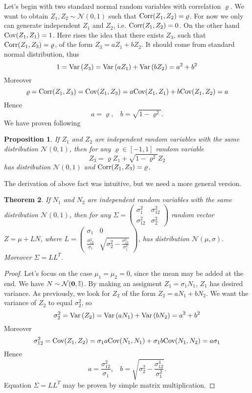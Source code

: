 \documentclass[a4paper,12pt, oneside]{book}
\newtheorem{thm}{Theorem}[section]
\newtheorem{prop}[thm]{Proposition}
\theoremstyle{definition}
\theoremstyle{remark}
\def\Var{{\rm Var}\,}
\def\Cov{{\hbox{Cov}}}
\def\Corr{{\hbox{Corr}}}
\begin{document}
Let's begin with two standard normal random variables with correlation $\varrho$. We want to obtain $Z_1, Z_2 \sim \mathcal{N}(0,1)$ such that $\Corr(Z_1, Z_2) = \varrho$.  For now we only can generate independent $Z_1$ and $Z_2$, i.e. $\Corr(Z_1, Z_2) = 0$. On the other hand $\Cov(Z_1, Z_1) = 1$. Here rises the idea that there exists $Z_3$, such that $\Corr(Z_1, Z_3) = \varrho$, of the form $Z_3 = a Z_1 + b Z_2$. It should come from standard normal distribution, thus
\[ 1 = \Var(Z_3) = \Var( a Z_1) +  \Var(b Z_2) = a^2 + b^2 \]
Moreover
\[ \varrho = \Corr(Z_1, Z_3) = \Cov(Z_1, Z_3) = a\Cov(Z_1, Z_1) + b\Cov(Z_1, Z_2) = a \]
Hence
\[ a = \varrho,\ \ \ \ b = \sqrt{1 - \varrho^2}. \]
We have proven following
\begin{prop}
 If $Z_1$ and $Z_2$ are independent random variables with the same distribution $\mathcal{N}(0,1)$, then for any $\varrho \in [-1,1]$ random variable
 \[ Z_3 = \varrho Z_1 + \sqrt{1 - \varrho^2} Z_2 \]
 has distribution $\mathcal{N}(0,1)$ and $\Corr(Z_1, Z_3) = \varrho$.
\end{prop}
The derivation of above fact was intuitive, but we need a more general version.


\begin{thm}
 If $N_1$ and $N_2$ are independent random variables with the same distribution $\mathcal{N}(0,1)$, then for any
 $\Sigma = \left( \begin{array}{cc}
                      \sigma_1^2 & \sigma_{12}^2 \\
                      \sigma_{12}^2 & \sigma_2^2
                   \end{array} \right)$
 random vector $ Z = \mu + LN$, where
  $L = \left( \begin{array}{cc}
                      \sigma_1 & 0 \\
                      \frac{\sigma_{12}^2}{\sigma_1} & \sqrt{\sigma_2^2 - \frac{\sigma_{12}^4}{\sigma_1^2}}
                   \end{array} \right)$,
 has distribution $\mathcal{N}(\mu,\sigma)$. Moreover $\Sigma = LL^T$.
\end{thm}
\begin{proof}
Let's focus on the case $\mu_1 = \mu_2 = 0$, since the mean may be added at the end. We have $N \sim \mathcal{N}(\bf{0}, \mathbb{I})$. By making an assigment $Z_1 = \sigma_1 N_1$, $Z_1$ has desired variance. As previously, we look for $Z_2$ of the form $Z_2 = a N_1 + b N_2$. We want the variance of $Z_2$ to equal $\sigma_2^2$, so
\[ \sigma_2^2 = \Var(Z_2) = \Var( a N_1) +  \Var(b N_2) = a^2 + b^2 \]
Moreover
\[ \sigma_{12}^2 = \Cov(Z_1, Z_2) = \sigma_1 a\Cov(N_1, N_1) + \sigma_1 b\Cov(N_1, N_2) = a\sigma_1 \]
Hence
\[ a = \frac{\sigma_{12}^2}{\sigma_1},\ \ \ \ b = \sqrt{\sigma_2^2 - \frac{\sigma_{12}^4}{\sigma_1^2}}. \] 
Equation $\Sigma = LL^T$ may be proven by simple matrix multiplication.
\end{proof}
\end{document}
